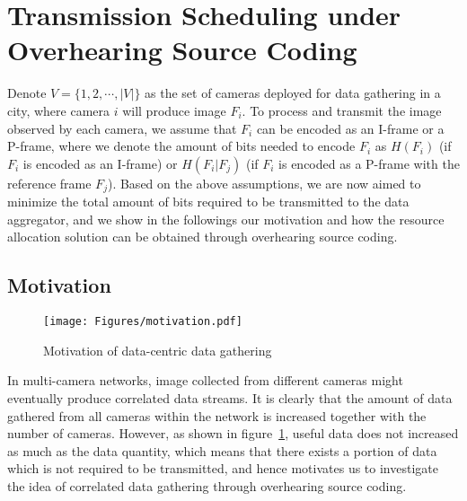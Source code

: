 \section{Transmission Scheduling under Overhearing Source Coding}
\label{sec::OSC}
Denote ${V=\{ 1,2,\cdots,|V| \}}$ as the set of cameras deployed for data gathering in a city, where camera $i$ will produce image $F_i$.
To process and transmit the image observed by each camera, we assume that $F_i$ can be encoded as an I-frame or a P-frame, where we denote the amount of bits needed to encode $F_i$ as $H(F_i)$ (if $F_i$ is encoded as an I-frame) or $H(F_i|F_j)$ (if $F_i$ is encoded as a P-frame with the reference frame $F_j$).
Based on the above assumptions, we are now aimed to minimize the total amount of bits required to be transmitted to the data aggregator, and we show in the followings our motivation and how the resource allocation solution can be obtained through overhearing source coding.
%
\subsection{Motivation}
\begin{figure}
\begin{center}
\texttt{[image: Figures/motivation.pdf]}
\caption{\label{fig::motivation}Motivation of data-centric data gathering}
\end{center}
\end{figure}
In multi-camera networks, image collected from different cameras might eventually produce correlated data streams.
It is clearly that the amount of data gathered from all cameras within the network is increased together with the number of cameras.
However, as shown in figure~\ref{fig::motivation}, useful data does not increased as much as the data quantity, which means that there exists a portion of data which is not required to be transmitted, and hence motivates us to investigate the idea of correlated data gathering through overhearing source coding.
%
